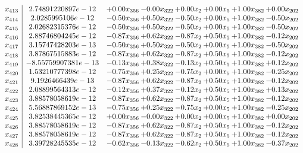 \documentclass[8pt]{article}
\begin{document}
\[\begin{array}{c| c c@{\hskip 2pt} c@{\hskip 2pt} c@{\hskip 2pt} c@{\hskip 2pt} c@{\hskip 2pt} c@{\hskip 2pt} }
 x_{413}   &  2.74891220897e-12 & +  0.00 x_{356} & -0.00 x_{322} & +  0.00 x_{2} & +  0.00 x_{5} & +  1.00 x_{382} & +  0.00 x_{202}\\
 x_{414}   &  2.0285995106e-12 & -0.50 x_{356} & +  0.50 x_{322} & -0.50 x_{2} & +  0.00 x_{5} & +  1.00 x_{382} & -0.50 x_{202}\\
 x_{415}   &  2.02682315376e-12 & -0.50 x_{356} & +  0.50 x_{322} & -0.50 x_{2} & +  0.00 x_{5} & +  1.00 x_{382} & -0.50 x_{202}\\
 x_{416}   &  2.88746804245e-12 & -0.87 x_{356} & +  0.62 x_{322} & -0.87 x_{2} & +  0.50 x_{5} & +  1.00 x_{382} & -0.12 x_{202}\\
 x_{417}   &  3.15747428203e-13 & -0.50 x_{356} & +  0.50 x_{322} & -0.50 x_{2} & +  0.00 x_{5} & +  1.00 x_{382} & -0.50 x_{202}\\
 x_{418}   &  3.87867515883e-12 & -0.87 x_{356} & +  0.62 x_{322} & -0.87 x_{2} & +  0.50 x_{5} & +  1.00 x_{382} & -0.12 x_{202}\\
 x_{419}   &  -8.55759907381e-13 & -0.13 x_{356} & +  0.38 x_{322} & -0.13 x_{2} & +  0.50 x_{5} & +  1.00 x_{382} & +  0.12 x_{202}\\
 x_{420}   &  1.53210777398e-12 & -0.75 x_{356} & +  0.25 x_{322} & -0.75 x_{2} & +  0.00 x_{5} & +  1.00 x_{382} & -0.25 x_{202}\\
 x_{421}   &  9.1926466439e-13 & -0.87 x_{356} & +  0.62 x_{322} & -0.87 x_{2} & +  0.50 x_{5} & +  1.00 x_{382} & -0.12 x_{202}\\
 x_{422}   &  2.08899564313e-12 & -0.12 x_{356} & +  0.37 x_{322} & -0.12 x_{2} & +  0.50 x_{5} & +  1.00 x_{382} & +  0.13 x_{202}\\
 x_{423}   &  3.88578058619e-12 & -0.87 x_{356} & +  0.62 x_{322} & -0.87 x_{2} & +  0.50 x_{5} & +  1.00 x_{382} & -0.12 x_{202}\\
 x_{424}   &  5.56887869152e-13 & -0.75 x_{356} & +  0.25 x_{322} & -0.75 x_{2} & +  0.00 x_{5} & +  1.00 x_{382} & -0.25 x_{202}\\
 x_{425}   &  3.82538445365e-12 & +  0.00 x_{356} & -0.00 x_{322} & +  0.00 x_{2} & +  0.00 x_{5} & +  1.00 x_{382} & +  0.00 x_{202}\\
 x_{426}   &  3.88578058619e-12 & -0.87 x_{356} & +  0.62 x_{322} & -0.87 x_{2} & +  0.50 x_{5} & +  1.00 x_{382} & -0.12 x_{202}\\
 x_{427}   &  3.88578058619e-12 & -0.87 x_{356} & +  0.62 x_{322} & -0.87 x_{2} & +  0.50 x_{5} & +  1.00 x_{382} & -0.12 x_{202}\\
 x_{428}   &  3.39728245535e-12 & -0.62 x_{356} & -0.13 x_{322} & -0.62 x_{2} & +  0.50 x_{5} & +  1.00 x_{382} & -0.37 x_{202}\\

\end{array}\]
\end{document}
